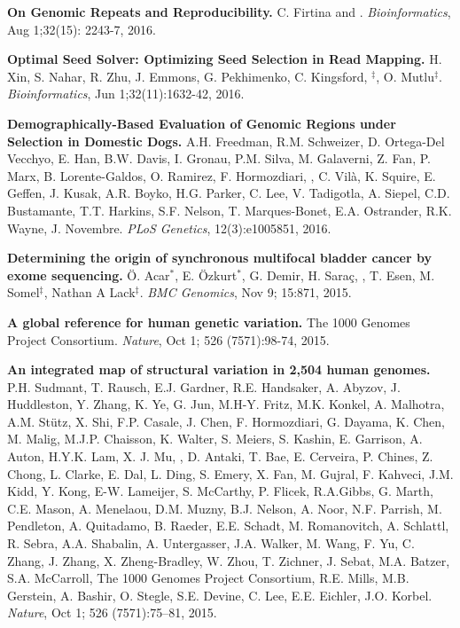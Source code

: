   \vspace{-.2cm}        
  {\bf On Genomic Repeats and Reproducibility.}
  C. Firtina and \calkan{}.
 {\em Bioinformatics}, Aug 1;32(15): 2243-7, 2016.

  \vspace{-.2cm}        
  {\bf Optimal Seed Solver: Optimizing Seed Selection in Read Mapping.}
  H. Xin, S. Nahar, R. Zhu, J. Emmons, G. Pekhimenko, C. Kingsford, \calkan{}$^\ddag$, O. Mutlu$^\ddag$.
 {\em Bioinformatics}, Jun 1;32(11):1632-42, 2016.

  \vspace{-.2cm}        
  {\bf Demographically-Based Evaluation of Genomic Regions under Selection in Domestic Dogs.}
A.H. Freedman, R.M. Schweizer, D. Ortega-Del Vecchyo, E. Han, B.W. Davis, I. Gronau, P.M. Silva, M. Galaverni, Z. Fan, P. Marx, B. Lorente-Galdos, O. Ramirez, F. Hormozdiari, \calkan{}, C. Vilà, K. Squire, 
E. Geffen, J. Kusak, A.R. Boyko, H.G. Parker, C. Lee, V. Tadigotla, A. Siepel, C.D. Bustamante, T.T. Harkins, S.F. Nelson, T. Marques-Bonet, E.A. Ostrander, R.K. Wayne, J. Novembre.
 {\em PLoS Genetics}, 12(3):e1005851, 2016.

  \vspace{-.2cm}        
  {\bf Determining the origin of synchronous multifocal bladder cancer by exome sequencing.} 
  Ö. Acar$^*$, E. Özkurt$^*$, G. Demir, H. Saraç, \calkan{}, T. Esen, M. Somel$^\ddag$, Nathan A Lack$^\ddag$.
 {\em BMC Genomics}, Nov 9; 15:871, 2015.

  \vspace{-.2cm}        
  {\bf A global reference for human genetic variation.} The 1000 Genomes Project Consortium.  {\em Nature}, Oct 1; 526 (7571):98-74, 2015.

  \vspace{-.2cm}        
  {\bf An integrated map of structural variation in 2,504 human genomes.}
  P.H. Sudmant, T. Rausch, E.J. Gardner,  R.E. Handsaker, A. Abyzov, J. Huddleston, Y. Zhang, K. Ye, G. Jun, M.H-Y. Fritz, M.K. Konkel, A. Malhotra, A.M. Stütz, X. Shi, F.P. Casale, J. Chen, 
  F. Hormozdiari, G. Dayama, K. Chen, M. Malig, M.J.P. Chaisson, K. Walter, S. Meiers, S. Kashin, E. Garrison, A. Auton, H.Y.K. Lam, X. J. Mu, \calkan, D. Antaki, T. Bae, E. Cerveira, P. Chines, Z. Chong, 
  L. Clarke, E. Dal, L. Ding, S. Emery, X. Fan, M. Gujral, F. Kahveci, J.M. Kidd, Y. Kong, E-W. Lameijer, S. McCarthy, P. Flicek, R.A.Gibbs, G. Marth, C.E. Mason, A. Menelaou, D.M. Muzny, 
  B.J. Nelson, A. Noor, N.F. Parrish, M. Pendleton, A. Quitadamo, B. Raeder, E.E. Schadt, M. Romanovitch, A. Schlattl, R. Sebra, A.A. Shabalin, A. Untergasser, 
  J.A. Walker, M. Wang, F. Yu, C. Zhang, J. Zhang, X. Zheng-Bradley, W. Zhou, T. Zichner, J. Sebat, M.A. Batzer, S.A. McCarroll, 
  The 1000 Genomes Project Consortium, R.E. Mills, M.B. Gerstein, A. Bashir, O. Stegle, S.E. Devine, C. Lee, E.E. Eichler, J.O. Korbel. 
  {\em Nature}, Oct 1; 526 (7571):75–81, 2015.



